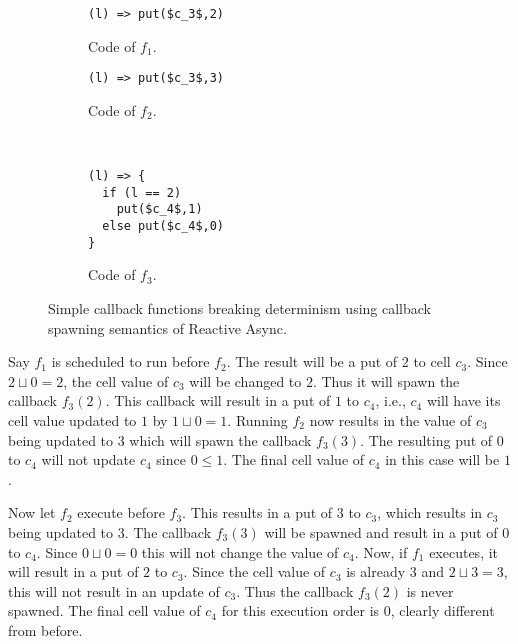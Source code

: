 \begin{figure}
  \begin{minipage}{0.5\textwidth}
    \begin{subfigure}[b]{\linewidth}
      \begin{lstlisting}
(l) => put($c_3$,2)
      \end{lstlisting}
      \caption{Code of $f_1$.}
    \end{subfigure}
    \begin{subfigure}[b]{\linewidth}
      \begin{lstlisting}
(l) => put($c_3$,3)
      \end{lstlisting}
      \caption{Code of $f_2$.}
    \end{subfigure}
  \end{minipage}
  ~
  \begin{minipage}{0.5\textwidth}
    \begin{subfigure}[b]{\linewidth}
      \begin{lstlisting}
(l) => {
  if (l == 2)
    put($c_4$,1)
  else put($c_4$,0)
}
      \end{lstlisting}
      \caption{Code of $f_3$.}
    \end{subfigure}
  \end{minipage}
  \caption{Simple callback functions breaking determinism using callback
  spawning semantics of Reactive Async.}
  \label{fig:ra_fun_callback_spawn}
\end{figure}

Say $f_1$ is scheduled to run before $f_2$. The result will be a put of $2$ to
cell $c_3$.  Since $2 \sqcup 0 = 2$, the cell value of $c_3$ will be changed to
$2$. Thus it will spawn the callback $f_3(2)$. This callback will result in a
put of $1$ to $c_4$, i.e., $c_4$ will have its cell value updated to $1$ by $1
\sqcup 0 = 1$.  Running $f_2$ now results in the value of $c_3$ being updated to
$3$ which will spawn the callback $f_3(3)$. The resulting put of $0$ to $c_4$
will not update $c_4$ since $0 \leq 1$. The final cell value of $c_4$ in this
case will be $1$.

Now let $f_2$ execute before $f_3$. This results in a put of $3$ to $c_3$, which
results in $c_3$ being updated to $3$. The callback $f_3(3)$ will be spawned and
result in a put of $0$ to $c_4$. Since $0 \sqcup 0 = 0$ this will not change the
value of $c_4$. Now, if $f_1$ executes, it will result in a put of $2$ to $c_3$.
Since the cell value of $c_3$ is already $3$ and $2 \sqcup 3 = 3$, this will not
result in an update of $c_3$. Thus the callback $f_3(2)$ is never spawned. The
final cell value of $c_4$ for this execution order is $0$, clearly different
from before.

